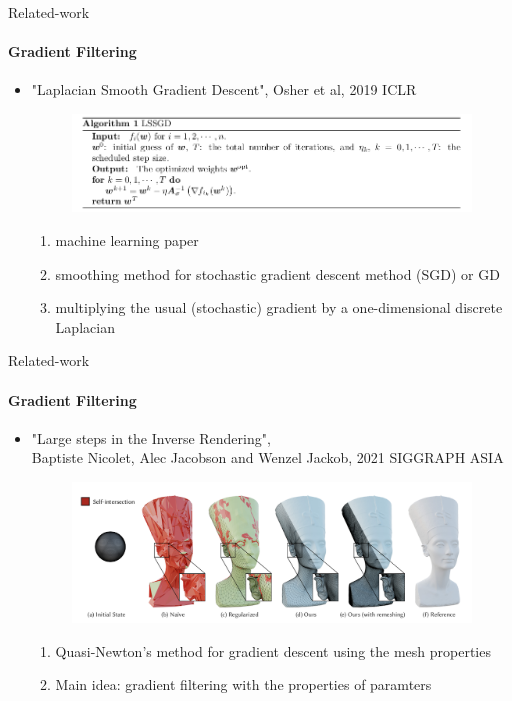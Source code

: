 \documentclass[beamer]{standalone}
\begin{document}
\begin{frame}{Related-work}
\framesubtitle{Gradient Filtering}

\begin{itemize}
    \item "Laplacian Smooth Gradient Descent", Osher et al, 2019 ICLR
    \begin{figure}[h]
        \includegraphics[width=0.8\linewidth]{./figures/related-work-1.png}
    \end{figure}
    \begin{enumerate}
        \item machine learning paper 
        \item smoothing method for stochastic gradient descent method (SGD) or GD
        \item multiplying the usual (stochastic) gradient by a one-dimensional discrete Laplacian
    \end{enumerate}

\end{itemize}

\note[item] {

    }
\end{frame}

\begin{frame}{Related-work}
\framesubtitle{Gradient Filtering}
\begin{itemize}
    \item "Large steps in the Inverse Rendering", \\ 
    Baptiste Nicolet, Alec Jacobson and Wenzel Jackob, 2021 SIGGRAPH ASIA
    \begin{figure}[h]
        \includegraphics[width=0.8\linewidth]{./figures/related-work-2.png}
    \end{figure}
    \begin{enumerate}
        \item Quasi-Newton's method for gradient descent using the mesh properties
        \item Main idea: gradient filtering with the properties of paramters
    \end{enumerate}
\end{itemize}
    
\note[item]{
    }   
\end{frame}
\end{document}

